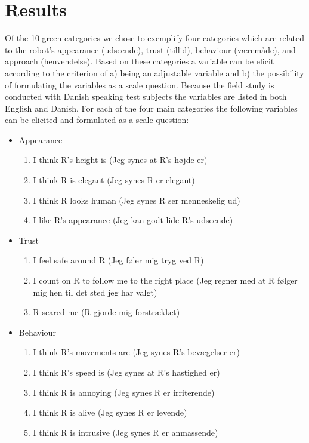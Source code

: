 \section{Results}
\label{Results}
%
Of the 10 green categories we chose to exemplify four categories which are related to the robot’s appearance (udseende), trust (tillid), behaviour (væremåde), and approach (henvendelse). Based on these categories a variable can be elicit according to the criterion of a) being an adjustable variable and b) the possibility of formulating the variables as a scale question. Because the field study is conducted with Danish speaking test subjects the variables are listed in both English and Danish. For each of the four main categories the following variables can be elicited and formulated as a scale question:\\
%
\begin{itemize}
\item Appearance
\begin{enumerate}
  \item I think R's height is (Jeg synes at R's højde er)
  \item I think R is elegant (Jeg synes R er elegant)
  \item I think R looks human (Jeg synes R ser menneskelig ud)
  \item I like R's appearance (Jeg kan godt lide R's udseende)\\
\end{enumerate}
\item Trust 
\begin{enumerate}
  \item I feel safe around R (Jeg føler mig tryg ved R)
  \item I count on R to follow me to the right place (Jeg regner med at R følger mig hen til det sted jeg har valgt)
  \item R scared me (R gjorde mig forstrækket)\\
\end{enumerate}
\item Behaviour
\begin{enumerate}
  \item I think R's movements are (Jeg synes R's bevægelser er)
  \item I think R's speed is (Jeg synes at R's hastighed er)
  \item I think R is annoying (Jeg synes R er irriterende)
  \item I think R is alive (Jeg synes R er levende)
  \item I think R is intrusive (Jeg synes R er anmassende)\\

\end{enumerate}
\end{itemize}
